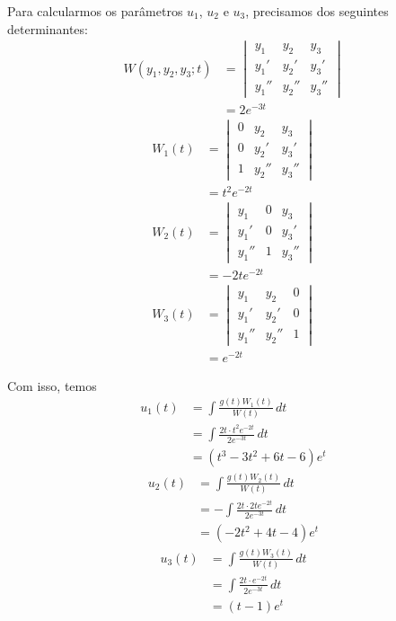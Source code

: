 \begin{resol}
  Para calcularmos os parâmetros $u_1$, $u_2$ e $u_3$, precisamos dos seguintes determinantes:
  \begin{align}
    W(y_1,y_2,y_3;t) &=
                       \begin{vmatrix}
                         y_1 & y_2 & y_3 \\
                         y_1' & y_2' & y_3' \\
                         y_1'' & y_2'' & y_3''
                       \end{vmatrix}\\
                     &= 2e^{-3t}
  \end{align}
  \begin{align}
    W_1(t) &=
          \begin{vmatrix}
            0 & y_2 & y_3 \\
            0 & y_2' & y_3' \\
            1 & y_2'' & y_3''
          \end{vmatrix}\\
        &= t^2e^{-2t}
  \end{align}
  \begin{align}
    W_2(t) &=
          \begin{vmatrix}
            y_1 & 0 & y_3 \\
            y_1' & 0 & y_3' \\
            y_1'' & 1 & y_3''
          \end{vmatrix}\\
        &= -2te^{-2t}
  \end{align}
  \begin{align}
    W_3(t) &=
          \begin{vmatrix}
            y_1 & y_2 & 0 \\
            y_1' & y_2' & 0 \\
            y_1'' & y_2'' & 1
          \end{vmatrix}\\
        &= e^{-2t}
  \end{align}

  Com isso, temos
  \begin{align}
    u_1(t) &= \int \frac{g(t)W_1(t)}{W(t)}\,dt \\
           &= \int \frac{2t\cdot t^2e^{-2t}}{2e^{-3t}}\,dt \\
           &= (t^3 - 3t^2 + 6t -6)e^t
  \end{align}
  \begin{align}
    u_2(t) &= \int \frac{g(t)W_2(t)}{W(t)}\,dt \\
           &= -\int \frac{2t\cdot 2te^{-2t}}{2e^{-3t}}\,dt \\
           &= (-2t^2 + 4t - 4)e^t
  \end{align}
  \begin{align}
    u_3(t) &= \int \frac{g(t)W_3(t)}{W(t)}\,dt \\
           &= \int \frac{2t\cdot e^{-2t}}{2e^{-3t}}\,dt \\
           &= (t-1)e^t
  \end{align}


\end{resol}
